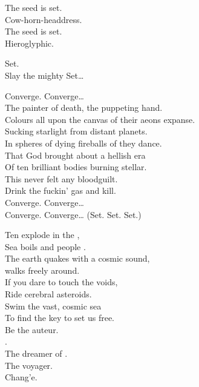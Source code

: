 The seed is set. \\
Cow-horn-headdress. \\
The seed is set. \\
Hieroglyphic. \\


Set. \\
Slay the mighty Set… \\


Converge. Converge… \\

The painter of death, the puppeting hand. \\
Colours all upon the canvas of their aeons expanse. \\
Sucking starlight from distant planets. \\
In spheres of dying fireballs of  they dance. \\

That God brought about a hellish era\\
Of ten brilliant bodies burning stellar. \\
This  never felt any bloodguilt. \\
Drink the fuckin' gas and kill. \\

Converge. Converge… \\
Converge. Converge… (Set. Set. Set.) \\




Ten  explode in the , \\
Sea boils and people . \\
The earth quakes with a cosmic sound, \\
 walks freely around. \\
If you dare to touch the voids, \\
Ride cerebral asteroids. \\
Swim the vast, cosmic sea \\
To find the key to set us free. \\

Be the auteur. \\
. \\
The dreamer of . \\
The voyager. \\
Chang'e. \\

